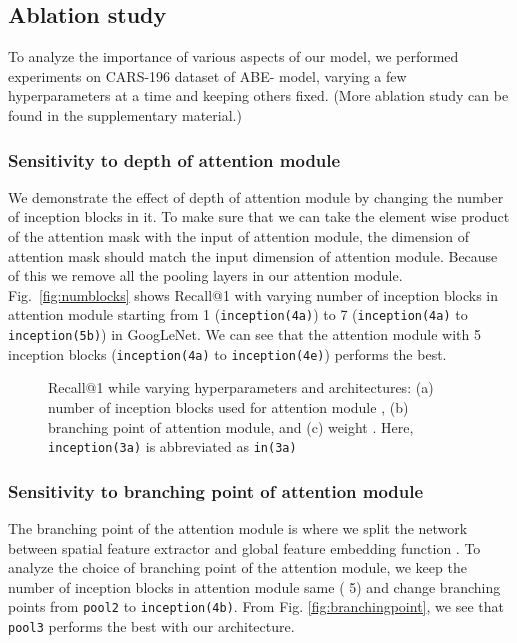 \documentclass[runningheads]{llncs}
\begin{document}
\vspace{-10mm}
\subsection{Ablation study} \label{sec:ablation}


To analyze the importance of various aspects of our model, we performed experiments on CARS-196 dataset of ABE- model, varying a few hyperparameters at a time and keeping others fixed. (More ablation study can be found in the supplementary material.)

\subsubsection{Sensitivity to depth of attention module}
We demonstrate the effect of depth of attention module by changing the number of inception blocks in it.
To make sure that we can take the element wise product of the attention mask with the input of attention module, the dimension of attention mask should match the input dimension of attention module.
Because of this we remove all the pooling layers in our attention module.
Fig.~\ref{fig:numblocks} shows Recall@1 with varying number of inception blocks in attention module starting from 1 (\texttt{inception(4a)}) to 7 (\texttt{inception(4a)} to \texttt{inception(5b)}) in GoogLeNet.
We can see that the attention module with 5 inception blocks (\texttt{inception(4a)} to \texttt{inception(4e)}) performs the best.


\begin{figure}[t]
\begin{center}
\end{center}
\vspace{-6mm}
\caption{Recall@1 while varying hyperparameters and architectures: (a) number of inception blocks used for attention module , (b) branching point of attention module, and (c) weight . Here, \texttt{inception(3a)} is abbreviated as \texttt{in(3a)}}
\label{fig:ablationfigures}
\end{figure}



\subsubsection{Sensitivity to branching point of attention module}
The branching point of the attention module is where we split the network between spatial feature extractor  and global feature embedding function .
To analyze the choice of branching point of the attention module, we keep the number of inception blocks in attention module same ( 5) and change branching points from \texttt{pool2} to \texttt{inception(4b)}. From Fig. \ref{fig:branchingpoint}, we see that \texttt{pool3} performs the best with our architecture.
\end{document}
